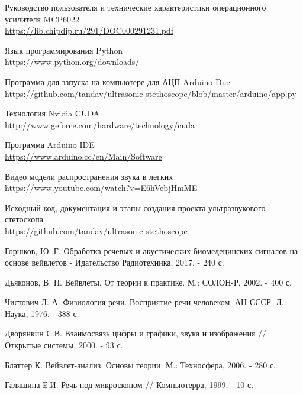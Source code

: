 \documentclass[../main.tex]{subfiles}
\begin{document}
\begin{thebibliography}{}
Руководство пользователя и технические характеристики операционного усилителя MCP6022\\
\url{https://lib.chipdip.ru/291/DOC000291231.pdf}

Язык программирования Python\\
\url{https://www.python.org/downloads/}

Программа для запуска на компьютере для АЦП Arduino Due\\
\url{https://github.com/tandav/ultrasonic-stethoscope/blob/master/arduino/app.py}

Технология Nvidia CUDA\\
\url{http://www.geforce.com/hardware/technology/cuda}

Программа Arduino IDE\\
\url{https://www.arduino.cc/en/Main/Software}

Видео модели распространения звука в легких\\
\url{https://www.youtube.com/watch?v=E6hVebjHmME}

Исходный код, документация и этапы создания проекта ультразвукового стетоскопа\\
\url{https://github.com/tandav/ultrasonic-stethoscope}

Горшков, Ю. Г. Обработка речевых и акустических биомедецинских сигналов на основе вейвлетов - Идательство Радиотехника, 2017. - 240 с.

Дьяконов, В. П. Вейвлеты. От теории к практике. М.: СОЛОН-Р, 2002. - 400 с.

Чистович Л. А. Физиология речи. Восприятие речи человеком. АН СССР. Л.: Наука, 1976. - 388 с.

Дворянкин С.В. Взаимосвязь цифры и графики, звука и изображения // Открытые системы, 2000. - 93 с.

Блаттер К. Вейвлет-анализ. Основы теории. М.: Техносфера, 2006. - 280 с.

Галяшина Е.И. Речь под микроскопом // Компьютерра, 1999. - 10 с.

\end{thebibliography}
\end{document}
